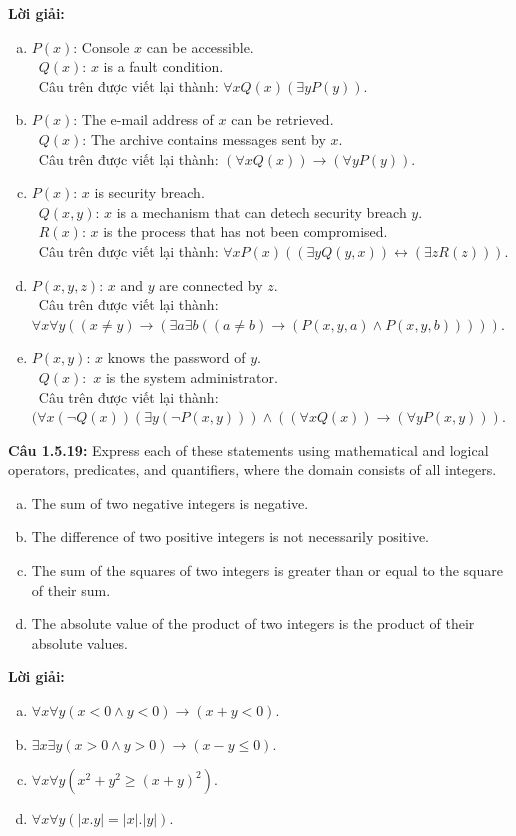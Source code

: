 \documentclass[a4paper]{article}
\begin{document}
\textbf{Lời giải:}
\begin{enumerate}[a)]
\item $P(x)$: Console $x$ can be accessible. \\\
$Q(x)$: $x$ is a fault condition. \\\
Câu trên được viết lại thành: $\forall x Q(x) (\exists y P(y)).$
\item $P(x)$: The e-mail address of $x$ can be retrieved. \\\
$Q(x)$: The archive contains messages sent by $x$. \\\
Câu trên được viết lại thành: $(\forall x Q(x))\rightarrow (\forall y P(y)).$
\item $P(x)$: $x$ is security breach. \\\
$Q(x,y)$: $x$ is a mechanism that can detech security breach $y$. \\\
$R(x)$: $x$ is the process that has not been compromised. \\\
Câu trên được viết lại thành: $\forall x P(x) ((\exists yQ(y,x)) \leftrightarrow (\exists zR(z)))$.
\item $P(x,y,z)$: $x$ and $y$ are connected by $z$. \\\
Câu trên được viết lại thành: $\forall x \forall y ((x \neq y) \rightarrow (\exists a \exists b ((a \neq b) \rightarrow (P(x,y,a) \land P(x,y,b))))).$
\item $P(x,y)$: $x$ knows the password of $y$. \\\
$Q(x):$ $x$ is the system administrator. \\\
Câu trên được viết lại thành: $(\forall x (\lnot Q(x))(\exists y (\lnot P(x,y))) \land ((\forall xQ(x)) \rightarrow (\forall y P(x,y))).$
\end{enumerate} 
\textbf{Câu 1.5.19: }Express each of these statements using mathematical and logical operators, predicates, and quantifiers, where the domain consists of all integers.
\begin{enumerate}[a)]
\item The sum of two negative integers is negative.
\item The difference of two positive integers is not necessarily positive.
\item The sum of the squares of two integers is greater than or equal to the square of their sum.
\item The absolute value of the product of two integers is the product of their absolute values.
\end{enumerate}
\textbf{Lời giải: }
\begin{enumerate}[a)]
\item $\forall x\forall y (x < 0 \land y < 0) \rightarrow (x+y < 0)$.
\item $\exists x \exists y (x > 0 \land y > 0) \rightarrow (x-y \leq 0)$.
\item $\forall x \forall y(x^2+y^2 \geq (x+y)^2)$.
\item $\forall x \forall y(|x.y| = |x|.|y|)$.
\end{enumerate}
\end{document}

